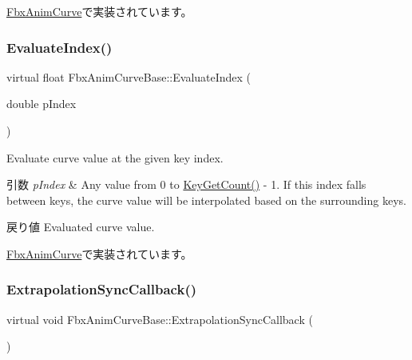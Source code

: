 \hyperlink{class_fbx_anim_curve_a74a3ea7a22a69fe69141722adff7f01b}{Fbx\+Anim\+Curve}で実装されています。

\mbox{\label{class_fbx_anim_curve_base_aa54f5c0c77e553be03ba888448dc1818}} 
\subsubsection{\texorpdfstring{Evaluate\+Index()}{EvaluateIndex()}}
{\footnotesize\ttfamily virtual float Fbx\+Anim\+Curve\+Base\+::\+Evaluate\+Index (\begin{DoxyParamCaption}\item[{double}]{p\+Index }\end{DoxyParamCaption})\hspace{0.3cm}{\ttfamily [pure virtual]}}

Evaluate curve value at the given key index. 
\begin{DoxyParams}{引数}
{\em p\+Index} & Any value from 0 to \hyperlink{class_fbx_anim_curve_base_a36fcc14d1c1944341da57085956a3f59}{Key\+Get\+Count()} -\/ 1. If this index falls between keys, the curve value will be interpolated based on the surrounding keys. \\
\hline
\end{DoxyParams}
\begin{DoxyReturn}{戻り値}
Evaluated curve value. 
\end{DoxyReturn}


\hyperlink{class_fbx_anim_curve_ad26cbb4cd0360aa8697a2601f8540a21}{Fbx\+Anim\+Curve}で実装されています。

\mbox{\label{class_fbx_anim_curve_base_aab573e42ece898c2c1e61a295adbb610}} 
\subsubsection{\texorpdfstring{Extrapolation\+Sync\+Callback()}{ExtrapolationSyncCallback()}}
{\footnotesize\ttfamily virtual void Fbx\+Anim\+Curve\+Base\+::\+Extrapolation\+Sync\+Callback (\begin{DoxyParamCaption}{ }\end{DoxyParamCaption})\hspace{0.3cm}{\ttfamily [pure virtual]}}



